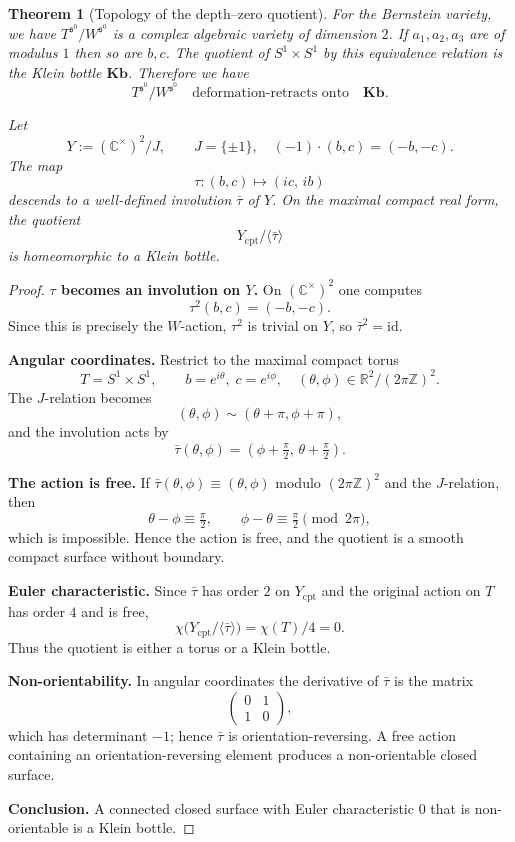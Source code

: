 \documentclass[11pt]{amsart}
\newtheorem{theorem}{Theorem}[section]
\theoremstyle{remark}
\theoremstyle{definition}
\newcommand{\Z}{\mathbb{Z}}
\newcommand{\R}{\mathbb{R}}
\newcommand{\C}{\mathbb{C}}
\newcommand{\fs}{\mathfrak{s}}
\begin{document}
\begin{theorem}[Topology of the depth--zero quotient]\label{prop:Klein}   For the  Bernstein variety, we have $T^{\fs^0} / W^{\fs^0}$ is a complex algebraic variety of dimension $2$.   
   If $a_1, a_2, a_3$ are of modulus $1$ then so are $b,c$.  The quotient of $S^1 \times S^1$ by this equivalence relation is the Klein bottle
$\mathbf{Kb}$.   Therefore we have
\[
T^{\fs^0} / W^{\fs^0}  \quad \textrm{deformation-retracts onto} \quad \mathbf{Kb}.
\]

Let
\[
Y := (\C^\times)^2 / J,
\qquad
J =\{\pm 1\},\quad
(-1)\cdot(b,c)=(-b,-c).
\]
The map
\[
\tau \colon (b,c)\longmapsto (ic,\,ib)
\]
descends to a well-defined involution $\bar\tau$ of $Y$.
On the maximal compact real form, the quotient
\[
Y_{\mathrm{cpt}}/\langle \bar\tau\rangle
\]
is homeomorphic to a Klein bottle.
\end{theorem}

\begin{proof}
\textbf{$\tau$ becomes an involution on $Y$.}
On $(\C^\times)^2$ one computes
\[
\tau^2(b,c)=(-b,-c).
\]
Since this is precisely the $W$-action, $\tau^2$ is trivial on $Y$,
so $\bar\tau^2=\mathrm{id}$.

\medskip
\textbf{Angular coordinates.}
Restrict to the maximal compact torus
\[
T=S^1\times S^1,\qquad
b=e^{i\theta},\; c=e^{i\phi},\quad
(\theta,\phi)\in\R^2/(2\pi\Z)^2.
\]
The $J$-relation becomes
\[
(\theta,\phi)\sim(\theta+\pi,\phi+\pi),
\]
and the involution acts by
\[
\bar\tau(\theta,\phi)
= (\phi+\tfrac{\pi}{2},\,\theta+\tfrac{\pi}{2}).
\]

\medskip
\textbf{The action is free.}
If $\bar\tau(\theta,\phi)\equiv(\theta,\phi)$ modulo
$(2\pi\Z)^2$ and the $J$-relation, then
\[
\theta-\phi\equiv\tfrac{\pi}{2},\qquad
\phi-\theta\equiv\tfrac{\pi}{2}\pmod{2\pi},
\]
which is impossible. Hence the action is free, and the quotient
is a smooth compact surface without boundary.

\medskip
\textbf{Euler characteristic.}
Since $\bar\tau$ has order $2$ on $Y_{\mathrm{cpt}}$
and the original action on $T$ has order $4$ and is free,
\[
\chi\bigl(Y_{\mathrm{cpt}}/\langle\bar\tau\rangle\bigr)
= \chi(T)/4 = 0.
\]
Thus the quotient is either a torus or a Klein bottle.

\medskip
\textbf{Non-orientability.}
In angular coordinates the derivative of $\bar\tau$ is the matrix
\[
\begin{pmatrix}0&1\\[2pt]1&0\end{pmatrix},
\]
which has determinant $-1$; hence $\bar\tau$ is
orientation-reversing.
A free action containing an orientation-reversing element
produces a non-orientable closed surface.

\medskip
\textbf{Conclusion.}
A connected closed surface with Euler characteristic $0$
that is non-orientable is a Klein bottle.
\end{proof}
\end{document}
